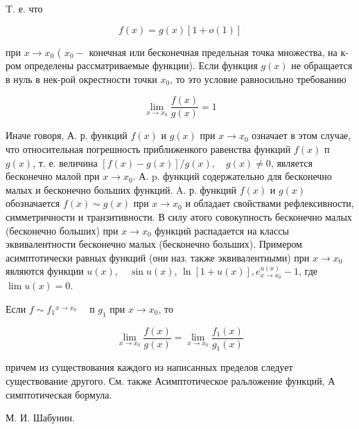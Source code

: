 \documentclass[10pt]{article}
\begin{document}
T. е. что



\[

f(x)=g(x)[1+o(1)]

\]



при $x \rightarrow x_{0}$ ( $x_{0}-$ конечная или бесконечная предельная точка множества, на к-ром определены рассматриваемые функции). Если функция $g(x)$ не обращается в нуль в нек-рой окрестности точки $x_{0}$, то это условие равносильно требованию



\[

\lim _{x \rightarrow x_{0}} \frac{f(x)}{g(x)}=1

\]



Иначе говоря, А. р. функций $f(x)$ и $g(x)$ при $x \rightarrow x_{0}$ означает в этом случае, что относительная погрешность приближенкого равенства функций $f(x)$ п $g(x)$, т. е. величина $[f(x)-g(x)] / g(x), \quad g(x) \neq 0$, является бесконечно малой при $x \rightarrow x_{0}$. А. p. функций содержательно для бесконечно малых и бесконечно больших функций. A. р. функций $f(x)$ и $g(x)$ обозначается $f(x) \sim g(x)$ при $x \rightarrow x_{0}$ и обладает свойствами рефлексивности, симметричности и транзитивности. В силу әтого совокупность бесконечно малых (бесконечно больших) при $x \rightarrow x_{0}$ функций распадается на классы эквивалентности бесконечно малых (бесконечно больших). Примером асимптотически равных функций (они наз. также эквивалентными) при $x \rightarrow x_{0}$ являются функции $u(x), \quad \sin u(x)$, $\ln [1+u(x)], e_{x \rightarrow x_{0}}^{u(x)}-1$, где $\lim u(x)=0$.



Если $f \sim f_{1} \stackrel{x \rightarrow x_{0}}{ } \quad$ п $g_{1}$ при $x \rightarrow x_{0}$, то



\[

\lim _{x \rightarrow x_{0}} \frac{f(x)}{g(x)}=\lim _{x \rightarrow x_{0}} \frac{f_{1}(x)}{g_{1}(x)}

\]



причем из существования каждого из написанных пределов следует существование другого. См. также Асимптотическое раљложение функций, А симптотическая бормула.



М. И. Шабунин.
\end{document}
